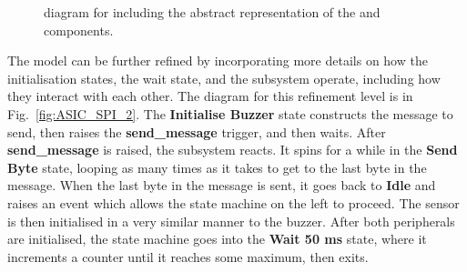 \begin{figure}[!tb]\centering
  \hfill
  \caption{\Statechart diagram for \IDS including the abstract representation of the \ASIC and \SPI components.}
\end{figure}

The model can be further refined by incorporating more details on how the initialisation states, the wait state, and the \SPI subsystem operate, including how they interact with each other. The \statechart diagram for this refinement level is in Fig.~\ref{fig:ASIC_SPI_2}. The \textbf{Initialise Buzzer} state constructs the \SPI message to send, then raises the \textbf{send\_message} trigger, and then waits.
After \textbf{send\_message} is raised, the \SPI subsystem reacts. It spins for a while in the \textbf{Send Byte} state, looping as many times as it takes to get to the last byte in the message. When the last byte in the message is sent, it goes back to \textbf{Idle} and raises an event which allows the state machine on the left to proceed. The sensor is then initialised in a very similar manner to the buzzer. After both peripherals are initialised, the state machine goes into the \textbf{Wait 50 ms} state, where it increments a counter until it reaches some maximum, then exits.

